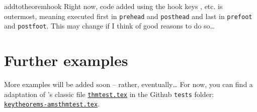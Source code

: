 \documentclass{ltxdoc}
\newcommand{\hook}{\texttt}
\begin{document}
\begin{docCommand}{addtotheoremhook}
Right now, code added using the hook keys , etc. is outermost, meaning executed first in \hook{prehead} and \hook{posthead} and last in \hook{prefoot} and \hook{postfoot}.
This may change if I think of good reasons to do so\dots
\end{docCommand}

\section{Further examples}

More examples will be added soon -- rather, eventually\dots{}
For now, you can find a  adaptation of 's classic file \href{https://mirrors.ctan.org/macros/latex/required/amscls/doc/thmtest.tex}{\texttt{thmtest.tex}} in the Github \texttt{tests} folder: \href{https://github.com/mbertucci47/keytheorems/blob/main/tests/keytheorems-amsthmtest.tex}{\texttt{keytheorems-amsthmtest.tex}}.


\printindex
\end{document}
